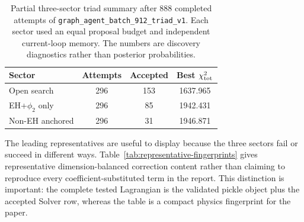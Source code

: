 \documentclass[aps,prd,twocolumn,superscriptaddress,nofootinbib,longbibliography]{revtex4-2}
\newcommand{\chiT}{\chi^2_{\rm tot}}
\begin{document}
\begin{table}[t]
\centering
\begin{ruledtabular}
\begin{tabular}{lccc}
Sector & Attempts & Accepted & Best $\chiT$ \\
\hline
Open search & 296 & 153 & 1637.965 \\
EH+$\phi_2$ only & 296 & 85 & 1942.431 \\
Non-EH anchored & 296 & 31 & 1946.871 \\
\end{tabular}
\end{ruledtabular}
\caption{Partial three-sector triad summary after 888 completed attempts of \texttt{graph\_agent\_batch\_912\_triad\_v1}.  Each sector used an equal proposal budget and independent current-loop memory.  The numbers are discovery diagnostics rather than posterior probabilities.}
\label{tab:triad-partial}
\end{table}

The leading representatives are useful to display because the three sectors fail or succeed in different ways.  Table~\ref{tab:representative-fingerprints} gives representative dimension-balanced correction content rather than claiming to reproduce every coefficient-substituted term in the report.  This distinction is important: the complete tested Lagrangian is the validated pickle object plus the accepted Solver row, whereas the table is a compact physics fingerprint for the paper.
\end{document}
